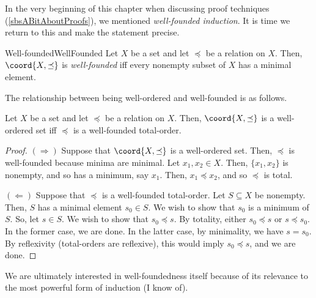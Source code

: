 In the very beginning of this chapter when discussing proof techniques (\cref{sbsABitAboutProofs}), we mentioned \emph{well-founded induction}.  It is time we return to this and make the statement precise.
\begin{dfn}{Well-founded}{WellFounded}
	Let $X$ be a set and let $\preceq$ be a relation on $X$.  Then, $\coord{X,\preceq}$ is \emph{well-founded} iff every nonempty subset of $X$ has a minimal element.
\end{dfn}
The relationship between being well-ordered and well-founded is as follows.
\begin{prp}{}{}
	Let $X$ be a set and let $\preceq$ be a relation on $X$.  Then, $\coord{X,\preceq}$ is a well-ordered set iff $\preceq$ is a well-founded total-order.
	\begin{proof}
		$(\Rightarrow )$ Suppose that $\coord{X,\preceq}$ is a well-ordered set.  Then, $\preceq$ is well-founded because minima are minimal.  Let $x_1,x_2\in X$.  Then, $\{ x_1,x_2\}$ is nonempty, and so has a minimum, say $x_1$.  Then, $x_1\preceq x_2$, and so $\preceq$ is total.
		
		\blankline
		\noindent
		$(\Leftarrow )$ Suppose that $\preceq$ is a well-founded total-order.  Let $S\subseteq X$ be nonempty.  Then, $S$ has a minimal element $s_0\in S$.  We wish to show that $s_0$ is a minimum of $S$.  So, let $s\in S$.  We wish to show that $s_0\preceq s$.  By totality, either $s_0\preceq s$ or $s\preceq s_0$.  In the former case, we are done.  In the latter case, by minimality, we have $s=s_0$.  By reflexivity (total-orders are reflexive), this would imply $s_0\preceq s$, and we are done.
	\end{proof}
\end{prp}
We are ultimately interested in well-foundedness itself because of its relevance to the most powerful form of induction (I know of).
